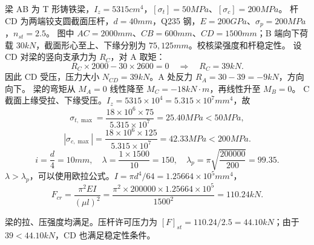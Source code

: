 \documentclass[a4paper,10pt,fontset=none]{ctexart}
\begin{document}
梁 AB 为 T 形铸铁梁，$I_z=5315\unit{cm^4}$，$[\sigma_t]=50\unit{MPa}$、$[\sigma_c]=200\unit{MPa}$。
杆 CD 为两端铰支圆截面压杆，$d=40\unit{mm}$，Q235 钢，$E=200\unit{GPa}$、$\sigma_p=200\unit{MPa}$，$n_{st}=2.5$。
图中 $AC=2000\unit{mm}$、$CB=600\unit{mm}$、$CD=1500\unit{mm}$；B 端向下荷载 $30\unit{kN}$，截面形心至上、下缘分别为 $75,125\unit{mm}$。校核梁强度和杆稳定性。
设 CD 对梁的竖向支承力为 $R_C$，对 A 取矩：
\[
R_C\times2000-30\times2600=0\quad\Longrightarrow\quad R_C=39\unit{kN}.
\]
因此 CD 受压，压力大小 $N_{CD}=39\unit{kN}$。A 处反力 $R_A=30-39=-9\unit{kN}$，方向向下。
梁的弯矩从 $M_A=0$ 线性降至 $M_C=-18\unit{kN\cdot m}$，再线性升至 $M_B=0$。
C 截面上缘受拉、下缘受压。$I_z=5315\times10^4=5.315\times10^7\unit{mm^4}$，故
\[
\sigma_{t,\max}=\frac{18\times10^6\times75}{5.315\times10^7}=25.40\unit{MPa}<50\unit{MPa},
\]
\[
|\sigma_{c,\max}|=\frac{18\times10^6\times125}{5.315\times10^7}=42.33\unit{MPa}<200\unit{MPa}.
\]
\[
i=\frac d4=10\unit{mm},\quad \lambda=\frac{1\times1500}{10}=150,\quad
\lambda_p=\pi\sqrt{\frac{200000}{200}}=99.35.
\]
$\lambda>\lambda_p$，可以使用欧拉公式。$I=\pi d^4/64=1.25664\times10^5\unit{mm^4}$，
\[
F_{cr}=\frac{\pi^2 EI}{(\mu l)^2}
=\frac{\pi^2\times200000\times1.25664\times10^5}{1500^2}
=110.24\unit{kN}.
\]
\begin{answerbox}
梁的拉、压强度均满足。压杆许可压力为
$[F]_{st}=110.24/2.5=44.10\unit{kN}$；由于 $39<44.10\unit{kN}$，CD 也满足稳定性条件。
\end{answerbox}
\end{document}
